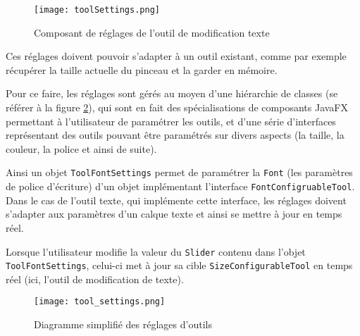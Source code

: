 \begin{figure}[!ht]
	\caption{Composant de réglages de l'outil de modification texte}
	\centering
	\texttt{[image: toolSettings.png]}
	\label{fig:text_settings}
\end{figure}

\par
Ces réglages doivent pouvoir s'adapter à un outil existant, comme par exemple récupérer la taille actuelle du pinceau et la garder en mémoire.

Pour ce faire, les réglages sont gérés au moyen d'une hiérarchie de classes (se référer à la figure \ref{fig:tool_settings}), qui sont en fait des spécialisations de composants JavaFX permettant à l'utilisateur de paramétrer les outils, et d'une série d'interfaces représentant des outils pouvant être paramétrés sur divers aspects (la taille, la couleur, la police et ainsi de suite).
\par
Ainsi un objet \texttt{ToolFontSettings} permet de paramétrer la \texttt{Font} (les paramètres de police d'écriture) d'un objet implémentant l'interface \texttt{FontConfigruableTool}. Dans le cas de l'outil texte, qui implémente cette interface, les réglages doivent s'adapter aux paramètres d'un calque texte et ainsi se mettre à jour en temps réel.
\par
Lorsque l'utilisateur modifie la valeur du \texttt{Slider} contenu dans l'objet \texttt{ToolFontSettings}, celui-ci met à jour sa cible \texttt{SizeConfigurableTool} en temps réel (ici, l'outil de modification de texte).

\begin{figure}[!ht]
	\caption{Diagramme simplifié des réglages d'outils}
	\centering
	\texttt{[image: tool\_settings.png]}
	\label{fig:tool_settings}
\end{figure}

\newpage

